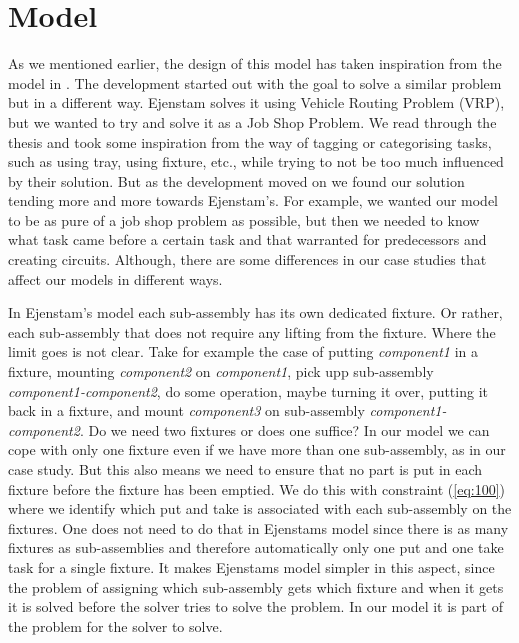 \section{Model}
As we mentioned earlier, the design of this model has taken inspiration from the model in \cite{ejenstam_2014}. The development started out with the goal to solve a similar problem but in a different way. Ejenstam solves it using Vehicle Routing Problem (VRP), but we wanted to try and solve it as a Job Shop Problem. We read through the thesis and took some inspiration from the way of tagging or categorising tasks, such as using tray, using fixture, etc., while trying to not be too much influenced by their solution. But as the development moved on we found our solution tending more and more towards Ejenstam's. For example, we wanted our model to be as pure of a job shop problem as possible, but then we needed to know what task came before a certain task and that warranted for predecessors and creating circuits. Although, there are some differences in our case studies that affect our models in different ways.

In Ejenstam's model each sub-assembly has its own dedicated fixture. Or rather, each sub-assembly that does not require any lifting from the fixture. Where the limit goes is not clear. Take for example the case of putting \emph{component1} in a fixture, mounting \emph{component2} on \emph{component1}, pick upp sub-assembly \emph{component1-component2}, do some operation, maybe turning it over, putting it back in a fixture, and mount \emph{component3} on sub-assembly \emph{component1-component2}. Do we need two fixtures or does one suffice? In our model we can cope with only one fixture even if we have more than one sub-assembly, as in our case study. But this also means we need to ensure that no part is put in each fixture before the fixture has been emptied. We do this with constraint (\ref{eq:100}) where we identify which put and take is associated with each sub-assembly on the fixtures. One does not need to do that in Ejenstams model since there is as many fixtures as sub-assemblies and therefore automatically only one put and one take task for a single fixture. It makes Ejenstams model simpler in this aspect, since the problem of assigning which sub-assembly gets which fixture and when it gets it is solved before the solver tries to solve the problem. In our model it is part of the problem for the solver to solve.

